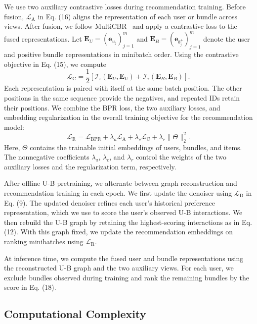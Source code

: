 \documentclass[letterpaper,journal]{IEEEtran}
\begin{document}
We use two auxiliary contrastive losses during recommendation training. Before fusion, $\mathcal L_{\mathrm A}$ in Eq. (16) aligns the representation of each user or bundle across views. After fusion, we follow MultiCBR~\cite{ma2024multicbr} and apply a contrastive loss to the fused representations. Let $\mathbf E_U=(\mathbf e_{u_j})_{j=1}^{m}$ and $\mathbf E_B=(\mathbf e_{b_j^+})_{j=1}^{m}$ denote the user and positive bundle representations in minibatch order. Using the contrastive objective in Eq. (15), we compute
\begin{equation}
\mathcal L_{\mathrm C}
=\frac{1}{2}\left[
\mathcal I_\tau(\mathbf E_U,\mathbf E_U)
+\mathcal I_\tau(\mathbf E_B,\mathbf E_B)
\right].
\tag{20}
\end{equation}
Each representation is paired with itself at the same batch position. The other positions in the same sequence provide the negatives, and repeated IDs retain their positions. We combine the BPR loss, the two auxiliary losses, and embedding regularization in the overall training objective for the recommendation model:
\begin{equation}
\mathcal L_{\mathrm R}
=\mathcal L_{\mathrm{BPR}}
+\lambda_a\mathcal L_{\mathrm A}
+\lambda_c\mathcal L_{\mathrm C}
+\lambda_r\|\Theta\|_2^2.
\tag{21}
\end{equation}
Here, $\Theta$ contains the trainable initial embeddings of users, bundles, and items. The nonnegative coefficients $\lambda_a$, $\lambda_c$, and $\lambda_r$ control the weights of the two auxiliary losses and the regularization term, respectively.

After offline U-B pretraining, we alternate between graph reconstruction and recommendation training in each epoch. We first update the denoiser using $\mathcal L_{\mathrm D}$ in Eq. (9). The updated denoiser refines each user's historical preference representation, which we use to score the user's observed U-B interactions. We then rebuild the U-B graph by retaining the highest-scoring interactions as in Eq. (12). With this graph fixed, we update the recommendation embeddings on ranking minibatches using $\mathcal L_{\mathrm R}$.

At inference time, we compute the fused user and bundle representations using the reconstructed U-B graph and the two auxiliary views. For each user, we exclude bundles observed during training and rank the remaining bundles by the score in Eq. (18).

\subsection{Computational Complexity}
\end{document}
